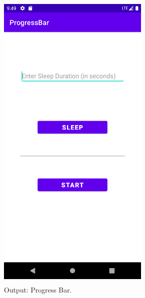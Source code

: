 \documentclass[12pt, a4]{article}
\begin{document}
\subsection*{}
\begin{figure}[h]
\centering
\caption{Output: Progress Bar.}
\includegraphics[height=15cm, width=7.3cm]{ProgressBar/Screenshots/Output-1.png}
\end{figure}

\newpage
\end{document}
